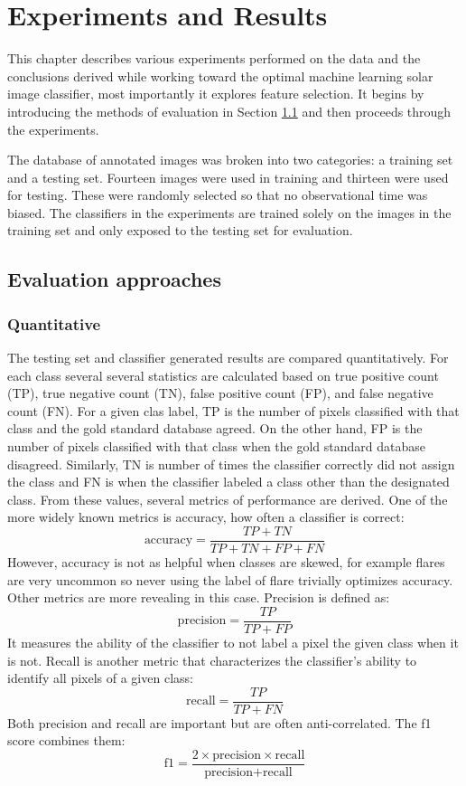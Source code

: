 \documentclass[twoside]{report}
\begin{document}
\chapter{Experiments and Results} \label{ch:experiments}

This chapter describes various experiments performed on the data and the conclusions derived while working toward the optimal machine learning solar image classifier, most importantly it explores feature selection. It begins by introducing the methods of evaluation in Section \ref{sec:evaluationmethods} and then proceeds through the experiments. 

The database of annotated images was broken into two categories: a training set and a testing set. Fourteen images were used in training and thirteen were used for testing. These were randomly selected so that no observational time was biased. The classifiers in the experiments are trained solely on the images in the training set and only exposed to the testing set for evaluation.

\section{Evaluation approaches}\label{sec:evaluationmethods}

\subsection{Quantitative}
The testing set and classifier generated results are compared quantitatively. For each class several several statistics are calculated based on true positive count (TP), true negative count (TN), false positive count (FP), and false negative count (FN). For a given clas label, TP is the number of pixels classified with that class and the gold standard database agreed. On the other hand, FP is the number of pixels classified with that class when the gold standard database disagreed. Similarly, TN is number of times the classifier correctly did not assign the class and FN is when the classifier labeled a class other than the designated class. From these values, several metrics of performance are derived. One of the more widely known metrics is accuracy, how often a classifier is correct:
\[\text{accuracy} = \frac{TP + TN}{TP + TN + FP + FN}\] However, accuracy is not as helpful when classes are skewed, for example flares are very uncommon so never using the label of flare trivially optimizes accuracy. Other metrics are more revealing in this case. Precision is defined as:
\[ \text{precision} = \frac{TP}{TP + FP} \]
It measures the ability of the classifier to not label a pixel the given class when it is not. Recall is another metric that characterizes the classifier's ability to identify all pixels of a given class:
\[\text{recall} = \frac{TP}{TP + FN}\]
Both precision and recall are important but are often anti-correlated. The f1 score combines them:
\[\text{f1} = \frac{2 \times \text{precision} \times \text{recall}}{\text{precision} + \text{recall}}\]
\end{document}
